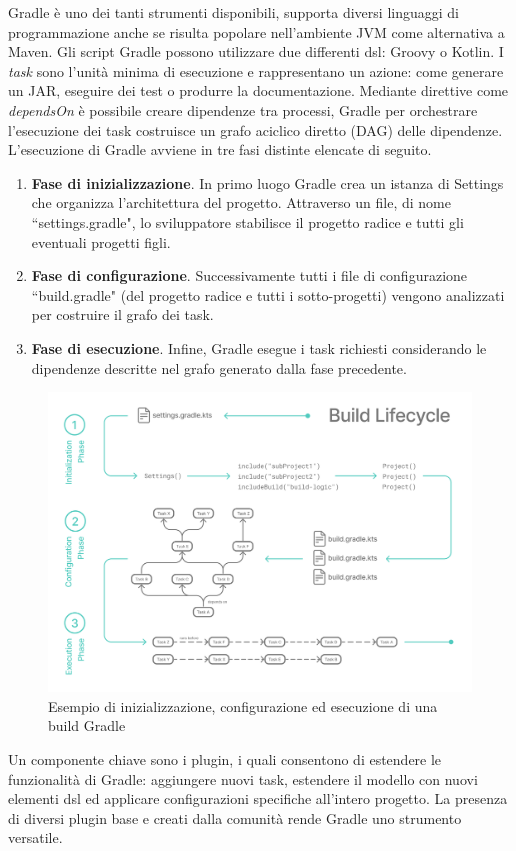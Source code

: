 Gradle è uno dei tanti strumenti disponibili, supporta diversi linguaggi di programmazione anche se risulta popolare nell'ambiente JVM come alternativa a Maven. Gli script Gradle possono utilizzare due differenti \ac{dsl}: Groovy o Kotlin. I \textit{task} sono l'unità minima di esecuzione e rappresentano un azione: come generare un JAR, eseguire dei test o produrre la documentazione. Mediante direttive come \textit{dependsOn} è possibile creare dipendenze tra processi, Gradle per orchestrare l'esecuzione dei task costruisce un grafo aciclico diretto (DAG) delle dipendenze. L'esecuzione di Gradle avviene in tre fasi distinte elencate di seguito.
\begin{enumerate}
	\item \textbf{Fase di inizializzazione}. In primo luogo Gradle crea un istanza di Settings che organizza l'architettura del progetto. Attraverso un file, di nome ``settings.gradle", lo sviluppatore stabilisce il progetto radice e tutti gli eventuali progetti figli. 
	\item \textbf{Fase di configurazione}. Successivamente tutti i file di configurazione ``build.gradle" (del progetto radice e tutti i sotto-progetti) vengono analizzati per costruire il grafo dei task.
	\item \textbf{Fase di esecuzione}. Infine, Gradle esegue i task richiesti considerando le dipendenze descritte nel grafo generato dalla fase precedente.
\end{enumerate}

\begin{figure}[H]
	\centering
	\includegraphics[width=.8\linewidth]{figures/gradle-build-lifecycle-example.png}
	\caption{Esempio di inizializzazione, configurazione ed esecuzione di una build Gradle}
	\label{fig:gradle-build-lifecycle}
\end{figure}
Un componente chiave sono i plugin, i quali consentono di estendere le funzionalità di Gradle: aggiungere nuovi task, estendere il modello con nuovi elementi \ac{dsl} ed applicare configurazioni specifiche all'intero progetto. La presenza di diversi plugin base e creati dalla comunità rende Gradle uno strumento versatile.
